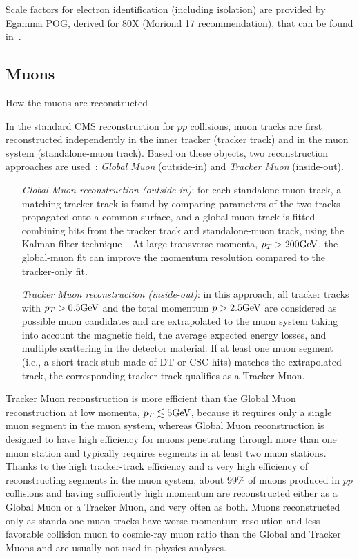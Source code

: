 Scale factors for electron identification (including isolation) are provided by Egamma POG, derived for 80X (Moriond 17 recommendation), that can be found in~\cite{EGammaPOG_ele_SF}.



\subsection{Muons}\label{ssec:muons}

{\color{red} How the muons are reconstructed}

In the standard CMS reconstruction for $pp$ collisions, muon tracks are first reconstructed independently in the inner tracker (tracker track) and in the muon system (standalone-muon track). Based on these objects, two reconstruction approaches are used~\cite{bib:CMS-PAPER-MUO-10-004}: \emph{Global Muon} (outside-in) and \emph{Tracker Muon} (inside-out).
\begin{itemize}
  \item[\emph{Global Muon reconstruction (outside-in)}:] for each standalone-muon track, a matching tracker track is found by comparing parameters of the two tracks propagated onto a common surface, and a global-muon track is fitted combining hits from the tracker track and standalone-muon track, using the Kalman-filter technique~\cite{bib:kalman}. At large transverse momenta, $p_T > 200 \text{GeV}$, the global-muon fit can improve the momentum resolution compared to the tracker-only fit.
  \item[\emph{Tracker Muon reconstruction (inside-out)}:] in this approach, all tracker tracks with $p_T > 0.5 \text{GeV}$ and the total momentum $p > 2.5 \text{GeV}$ are considered as possible muon candidates and are extrapolated to the muon system taking into account the magnetic field, the average expected energy losses, and multiple scattering in the detector material. If at least one muon segment (i.e., a short track stub made of DT or CSC hits) matches the extrapolated track, the corresponding tracker track qualifies as a Tracker Muon.
\end{itemize}

Tracker Muon reconstruction is more efficient than the Global Muon reconstruction at low momenta, $p_T \lesssim 5 \text{GeV}$, because it requires only a single muon segment in the muon system, whereas Global Muon reconstruction is designed to have high efficiency for muons penetrating through more than one muon station and typically requires segments in at least two muon stations. Thanks to the high tracker-track efficiency and a very high efficiency of reconstructing segments in the muon system, about 99\% of muons produced in $pp$ collisions and having sufficiently high momentum are reconstructed either as a Global Muon or a Tracker Muon, and very often as both. Muons reconstructed only as standalone-muon tracks have worse momentum resolution and less favorable collision muon to cosmic-ray muon ratio than the Global and Tracker Muons and are usually not used in physics analyses.


